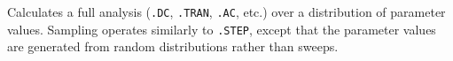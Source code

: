 


 
Calculates a full analysis (\verb|.DC|, \verb|.TRAN|, \verb|.AC|, etc.) over a distribution of
parameter values.  Sampling operates similarly to \verb|.STEP|, except that the parameter
values are generated from random distributions rather than sweeps.  


